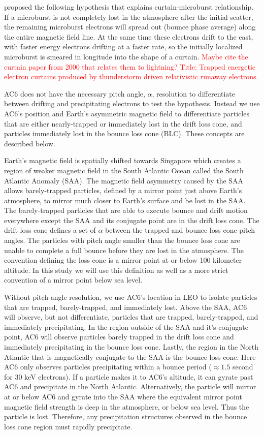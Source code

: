 \documentclass[draft]{agujournal2019}
\begin{document}
 proposed the following hypothesis that explains curtain-microburst relationship. If a microburst is not completely lost in the atmosphere after the initial scatter, the remaining microburst electrons will spread out (bounce phase average) along the entire magnetic field line. At the same time these electrons drift to the east, with faster energy electrons drifting at a faster rate, so the initially localized microburst is smeared in longitude into the shape of a curtain. \textcolor{red}{Maybe cite the curtain paper from 2000 that relates them to lightning? Title: Trapped energetic electron curtains produced by thunderstorm driven relativistic runaway electrons.}

AC6 does not have the necessary pitch angle, $\alpha$, resolution to differentiate between drifting and precipitating electrons to test the  hypothesis. Instead we use AC6's position and Earth's asymmetric magnetic field to differentiate particles that are either nearly-trapped or immediately lost in the drift loss cone, and particles immediately lost in the bounce loss cone (BLC). These concepts are described below.

Earth's magnetic field is spatially shifted towards Singapore which creates a region of weaker magnetic field in the South Atlantic Ocean called the South Atlantic Anomaly (SAA). The magnetic field asymmetry caused by the SAA allows barely-trapped particles, defined by a mirror point just above Earth's atmosphere, to mirror much closer to Earth's surface and be lost in the SAA. The barely-trapped particles that are able to execute bounce and drift motion everywhere except the SAA and its conjugate point are in the drift loss cone. The drift loss cone defines a set of $\alpha$ between the trapped and bounce loss cone pitch angles. The particles with pitch angle smaller than the bounce loss cone are unable to complete a full bounce before they are lost in the atmosphere. The convention defining the loss cone is a mirror point at or below 100 kilometer altitude. In this study we will use this definition as well as a more strict convention of a mirror point below sea level.

Without pitch angle resolution, we use AC6's location in LEO to isolate particles that are trapped, barely-trapped, and immediately lost. Above the SAA, AC6 will observe, but not differentiate, particles that are trapped, barely-trapped, and immediately precipitating. In the region outside of the SAA and it's conjugate point, AC6 will observe particles barely trapped in the drift loss cone and immediately precipitating in the bounce loss cone. Lastly, the region in the North Atlantic that is magnetically conjugate to the SAA is the bounce loss cone. Here AC6 only observes particles precipitating within a bounce period ($\approx 1.5$ second for 30 keV electrons). If a particle makes it to AC6's altitude, it can gyrate past AC6 and precipitate in the North Atlantic. Alternatively, the particle will mirror at or below AC6 and gyrate into the SAA where the equivalent mirror point magnetic field strength is deep in the atmosphere, or below sea level. Thus the particle is lost. Therefore, any precipitation structures observed in the bounce loss cone region must rapidly precipitate.
\end{document}
